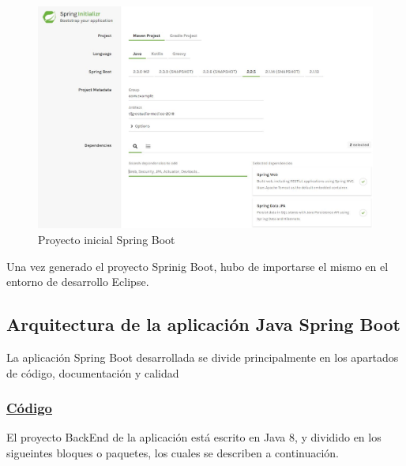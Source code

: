     \begin{figure}[h]
    \centering
     \includegraphics[width=1\textwidth]{images/springstarter}
    \caption{Proyecto inicial Spring Boot}
    \end{figure}
    
    Una vez generado el proyecto Sprinig Boot, hubo de importarse el mismo en el entorno de desarrollo Eclipse.
    
    
    \subsection{Arquitectura de la aplicación Java Spring Boot}
    La aplicación Spring Boot desarrollada se divide principalmente en los apartados de código, documentación y calidad

        \subsubsection{\underline{Código}}
        El proyecto BackEnd de la aplicación está escrito en Java 8, y dividido en los sigueintes bloques o paquetes, los cuales se describen a continuación.
        

